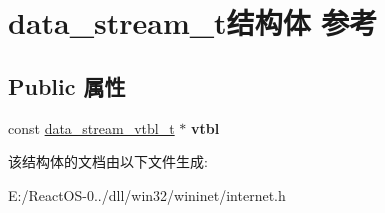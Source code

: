 \hypertarget{structdata__stream__t}{}\section{data\+\_\+stream\+\_\+t结构体 参考}
\label{structdata__stream__t}
\subsection*{Public 属性}
\begin{DoxyCompactItemize}
\item 
\mbox{\label{structdata__stream__t_af0ef3a8d0643e0df2d0ad4c85a63a19e}} 
const \hyperlink{structdata__stream__vtbl__t}{data\+\_\+stream\+\_\+vtbl\+\_\+t} $\ast$ {\bfseries vtbl}
\end{DoxyCompactItemize}


该结构体的文档由以下文件生成\+:\begin{DoxyCompactItemize}
\item 
E\+:/\+React\+O\+S-\/0../dll/win32/wininet/internet.\+h\end{DoxyCompactItemize}
